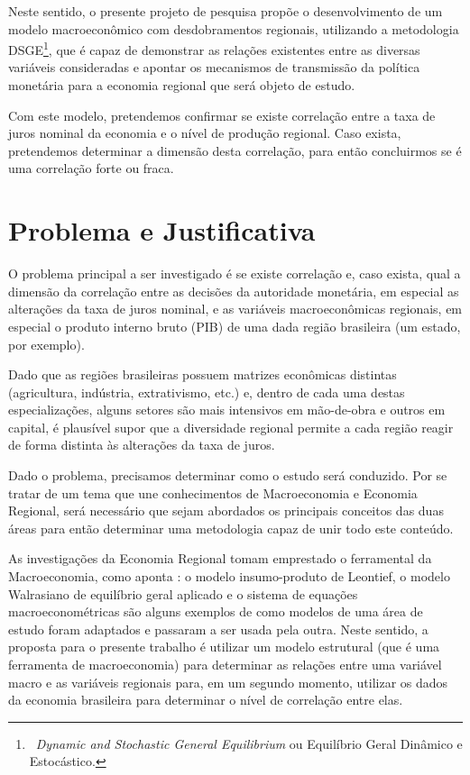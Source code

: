 \documentclass[12pt]{article}
\numberwithin{equation}{section}
\theoremstyle{definition}
\begin{document}
Neste sentido, o presente projeto de pesquisa propõe o desenvolvimento de um modelo macroeconômico com desdobramentos regionais, utilizando a metodologia DSGE\footnote{$\,$ \textit{Dynamic and Stochastic General Equilibrium} ou Equilíbrio Geral Dinâmico e Estocástico.}, que é capaz de demonstrar as relações existentes entre as diversas variáveis consideradas e apontar os mecanismos de transmissão da política monetária para a economia regional que será objeto de estudo.

Com este modelo, pretendemos confirmar se existe correlação entre a taxa de juros nominal da economia e o nível de produção regional. Caso exista, pretendemos determinar a dimensão desta correlação, para então concluirmos se é uma correlação forte ou fraca.

\newpage

\section{Problema e Justificativa} \label{sec:problemaEjustificativa}


O problema principal a ser investigado é se existe correlação e, caso exista, qual a dimensão da correlação entre as decisões da autoridade monetária, em especial as alterações da taxa de juros nominal, e as variáveis macroeconômicas regionais, em especial o produto interno bruto (PIB) de uma dada região brasileira (um estado, por exemplo).

\sloppy Dado que as regiões brasileiras possuem matrizes econômicas distintas (agricultura, indústria, extrativismo, etc.) e, dentro de cada uma destas especializações, alguns setores são mais intensivos em mão-de-obra e outros em capital, é plausível supor que a diversidade regional permite a cada região reagir de forma distinta às alterações da taxa de juros.

Dado o problema, precisamos determinar como o estudo será conduzido. Por se tratar de um tema que une conhecimentos de Macroeconomia e Economia Regional, será necessário que sejam abordados os principais conceitos das duas áreas para então determinar uma metodologia capaz de unir todo este conteúdo.

As investigações da Economia Regional tomam emprestado o ferramental da Macroeconomia, como aponta \textcite{rickman_modern_2010}: o modelo insumo-produto de Leontief, o modelo Walrasiano de equilíbrio geral aplicado e o sistema de equações macroeconométricas são alguns exemplos de como modelos de uma área de estudo foram adaptados e passaram a ser usada pela outra. Neste sentido, a proposta para o presente trabalho é utilizar um modelo estrutural (que é uma ferramenta de macroeconomia) para determinar as relações entre uma variável macro e as variáveis regionais para, em um segundo momento, utilizar os dados da economia brasileira para determinar o nível de correlação entre elas.
\end{document}
